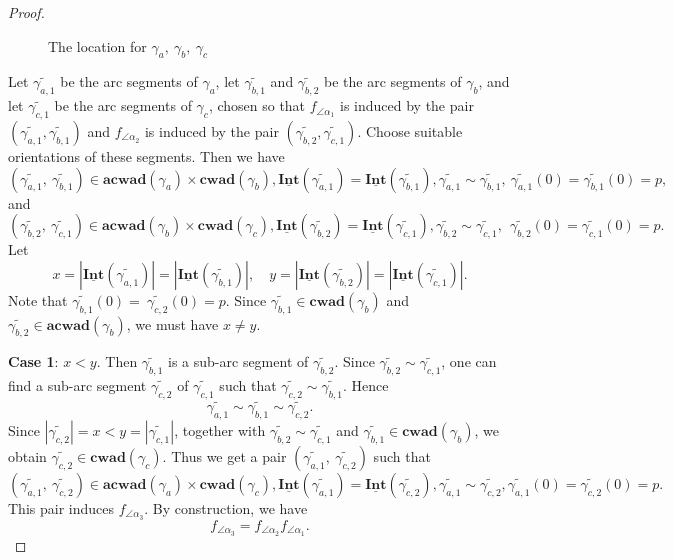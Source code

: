 \documentclass[a4paper,10pt]{amsart}
\theoremstyle{plain}          %
\theoremstyle{definition}
\newcommand{\Intv}{\underline{\mathbf{Int}}}
\newcommand{\aad}{\mathbf{acwad}}
\newcommand{\cad}{\mathbf{cwad}}
\begin{document}
\begin{proof}
\begin{figure}[h]
        \caption{The location for $\gamma_a,~\gamma_b,~\gamma_c$}\label{f:the location for k,j,i-}
    \end{figure}
Let $\widetilde{\gamma_{a,1}}$ be the arc segments of $\gamma_a$, let $\widetilde{\gamma_{b,1}}$ and $\widetilde{\gamma_{b,2}}$ be the arc segments of $\gamma_b$, and let $\widetilde{\gamma_{c,1}}$ be the arc segments of $\gamma_c$, chosen so that $f_{\angle\alpha_1}$ is induced by the pair $(\widetilde{\gamma_{a,1}},\widetilde{\gamma_{b,1}})$ and $f_{\angle\alpha_2}$ is induced by the pair $(\widetilde{\gamma_{b,2}},\widetilde{\gamma_{c,1}})$. Choose suitable orientations of these segments. Then we have 
 \[(\widetilde{\gamma_{a,1}},~\widetilde{\gamma_{b,1}})\in\aad(\gamma_a)\times\cad(\gamma_b), \Intv(\widetilde{\gamma_{a,1}})=\Intv(\widetilde{\gamma_{b,1}}), \widetilde{\gamma_{a,1}}\sim\widetilde{\gamma_{b,1}},~\widetilde{\gamma_{a,1}}(0)=\widetilde{\gamma_{b,1}}(0)=p,\] and
 \[(\widetilde{\gamma_{b,2}},~\widetilde{\gamma_{c,1}})\in\aad(\gamma_b)\times\cad(\gamma_c),\Intv(\widetilde{\gamma_{b,2}})=\Intv(\widetilde{\gamma_{c,1}}), \widetilde{\gamma_{b,2}}\sim\widetilde{\gamma_{c,1}},~~\widetilde{\gamma_{b,2}}(0)=\widetilde{\gamma_{c,1}}(0)=p.\]
  Let $$x=|\Intv(\widetilde{\gamma_{a,1}})|=|\Intv(\widetilde{\gamma_{b,1}})|, \quad y=|\Intv(\widetilde{\gamma_{b,2}})|=|\Intv(\widetilde{\gamma_{c,1}})|.$$ 
Note that $\widetilde{\gamma_{b,1}}(0)=~\widetilde{\gamma_{c,2}}(0)=p.$ Since $\widetilde{\gamma_{b,1}}\in\cad(\gamma_b)$ and $\widetilde{\gamma_{b,2}}\in\aad(\gamma_b)$, we must have $x\neq y$.

\noindent\textbf{Case 1}:  $x<y$. Then $\widetilde{\gamma_{b,1}}$ is a sub-arc segment of  $\widetilde{\gamma_{b,2}}$. Since $\widetilde{\gamma_{b,2}}\sim\widetilde{\gamma_{c,1}}$, one can find a sub-arc segment $\widetilde{\gamma_{c,2}}$ of $\widetilde{\gamma_{c,1}}$ such that $ \widetilde{\gamma_{c,2}}\sim \widetilde{\gamma_{b,1}}$. Hence $$\widetilde{\gamma_{a,1}}\sim \widetilde{\gamma_{b,1}}\sim \widetilde{\gamma_{c,2}}.$$
Since $|\widetilde{\gamma_{c,2}}|=x<y=|\widetilde{\gamma_{c,1}}|$, together with $\widetilde{\gamma_{b,2}}\sim\widetilde{\gamma_{c,1}}$ and
$\widetilde{\gamma_{b,1}}\in\cad(\gamma_b)$, we obtain
 $\widetilde{\gamma_{c,2}}\in \cad(\gamma_c)$. Thus we get a pair $(\widetilde{\gamma_{a,1}},~\widetilde{\gamma_{c,2}})$ such that 
\[(\widetilde{\gamma_{a,1}},~\widetilde{\gamma_{c,2}})\in\aad(\gamma_a)\times\cad(\gamma_c), \Intv(\widetilde{\gamma_{a,1}})=\Intv(\widetilde{\gamma_{c,2}}), \widetilde{\gamma_{a,1}}\sim\widetilde{\gamma_{c,2}},\widetilde{\gamma_{a,1}}(0)=\widetilde{\gamma_{c,2}}(0)=p.\]
This pair induces  $f_{\angle\alpha_3}$. By construction, we have $$f_{\angle\alpha_3}=f_{\angle\alpha_2}f_{\angle\alpha_1}.$$


\end{proof}
\end{document}
